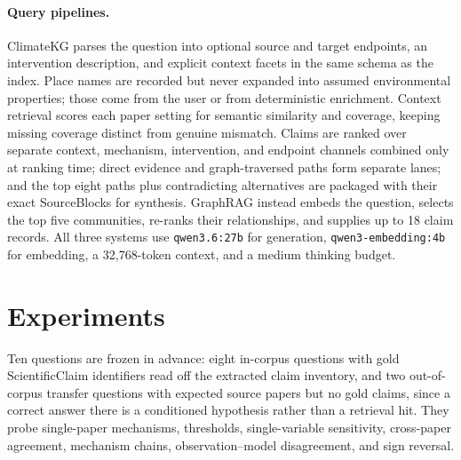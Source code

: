 \documentclass{article}
\begin{document}
\paragraph{Query pipelines.}
ClimateKG parses the question into optional source and target endpoints, an
intervention description, and explicit context facets in the same schema as the
index. Place names are recorded but never expanded into assumed environmental
properties; those come from the user or from deterministic enrichment. Context
retrieval scores each paper setting for semantic similarity and coverage, keeping
missing coverage distinct from genuine mismatch. Claims are ranked over separate
context, mechanism, intervention, and endpoint channels combined only at ranking time;
direct evidence and graph-traversed paths form separate lanes; and the top eight paths
plus contradicting alternatives are packaged with their exact SourceBlocks for
synthesis. GraphRAG instead embeds the question, selects the top five communities,
re-ranks their relationships, and supplies up to 18 claim records. All three systems
use \texttt{qwen3.6:27b} for generation, \texttt{qwen3-embedding:4b} for embedding, a
32{,}768-token context, and a medium thinking budget.

\section{Experiments}
\label{sec:experiments}

Ten questions are frozen in advance: eight in-corpus questions with gold
ScientificClaim identifiers read off the extracted claim inventory, and two out-of-corpus
transfer questions with expected source papers but no gold claims, since a correct answer
there is a conditioned hypothesis rather than a retrieval hit. They probe single-paper
mechanisms, thresholds, single-variable sensitivity, cross-paper agreement, mechanism
chains, observation--model disagreement, and sign reversal.
\end{document}
